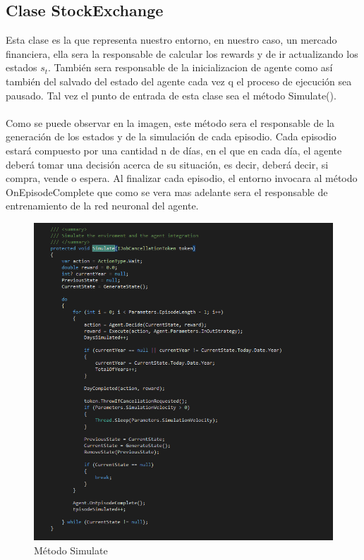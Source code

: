 \subsection{Clase StockExchange}

Esta clase es la que representa nuestro entorno, en nuestro caso, un mercado financiera, ella sera la responsable de calcular los rewards y de ir actualizando los estados $s_t$. También sera responsable de la inicializacion de agente como así también del salvado del estado del agente cada vez q el proceso de ejecución sea pausado. Tal vez el punto de entrada de esta clase sea el método Simulate().
\\\\
Como se puede observar en la imagen, este método sera el responsable de la generación de los estados y de la simulación de cada episodio. Cada episodio estará compuesto por una cantidad n de días, en el que en cada día, el agente
deberá tomar una decisión acerca de su situación, es decir, deberá decir, si compra, vende o espera. Al finalizar cada episodio, el entorno invocara al método OnEpisodeComplete que como se vera mas adelante sera el responsable de entrenamiento de la red neuronal del agente.\\

\begin{figure}[h!]
	\centering
	\includegraphics[scale=0.7]{imagenes/screen5.png}
	\caption{Método Simulate}
\end{figure}

